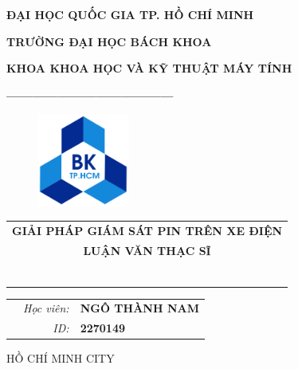 \documentclass[a4paper,11pt]{article}
\theoremstyle{mytheor}
\begin{document}
\begin{titlepage}
\begin{center} {\textbf{ĐẠI HỌC QUỐC GIA TP. HỒ CHÍ MINH}
}

{\textbf{TRƯỜNG ĐẠI HỌC BÁCH KHOA}
}

{\textbf{KHOA KHOA HỌC VÀ KỸ THUẬT MÁY TÍNH }
}

{\textbf{---------------------------------------}}

\end{center}

\vspace{1cm}

\begin{figure}[h!]
\begin{center}
\includegraphics[width=3cm]{hcmut.png}
\end{center}
\end{figure}

\vspace{2cm}


\begin{center}
\begin{tabular}{c}
\multicolumn{1}{c}{\textbf{\Large GIẢI PHÁP GIÁM SÁT PIN TRÊN XE ĐIỆN
}}
\vspace{2cm}
\\
\multicolumn{1}{c}{\textbf{\Large LUẬN VĂN THẠC SĨ}}


~~\\

\\
\multicolumn{1}{l}{\textbf{{\Large}}}\\
\\
\textbf{{\Large}}\\

\\
\\

\end{tabular}
\end{center}

\vspace{1cm}

\begin{table}[h]
\begin{tabular}{rrl}
\hspace{5.1cm} 
&\textit{Học viên: } & \textbf{NGÔ THÀNH NAM}\\
&\textit{ID: } & \textbf{2270149 }\\

\end{tabular}
\end{table}
\vspace{3cm}
\begin{center}
{\footnotesize HỒ CHÍ MINH CITY}
\end{center}
\end{titlepage}
\end{document}
